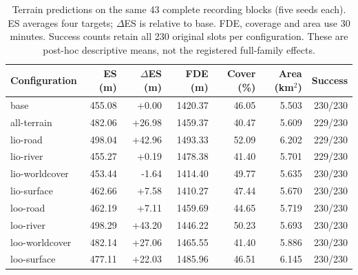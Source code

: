\begin{table}[!htbp]\centering
\caption{Terrain predictions on the same 43 complete recording blocks (five seeds each). ES averages four targets; $\Delta$ES is relative to base. FDE, coverage and area use 30 minutes. Success counts retain all 230 original slots per configuration. These are post-hoc descriptive means, not the registered full-family effects.}\label{tab:terrain-description}
\small\setlength{\tabcolsep}{3pt}
\begin{tabular}{lrrrrrr}\toprule
Configuration & ES (m) & $\Delta$ES (m) & FDE (m) & Cover (\%) & Area (km$^2$) & Success\\\midrule
base & 455.08 & +0.00 & 1420.37 & 46.05 & 5.503 & 230/230\\
all-terrain & 482.06 & +26.98 & 1459.37 & 40.47 & 5.609 & 229/230\\
lio-road & 498.04 & +42.96 & 1493.33 & 52.09 & 6.202 & 229/230\\
lio-river & 455.27 & +0.19 & 1478.38 & 41.40 & 5.701 & 229/230\\
lio-worldcover & 453.44 & -1.64 & 1414.40 & 49.77 & 5.635 & 230/230\\
lio-surface & 462.66 & +7.58 & 1410.27 & 47.44 & 5.670 & 230/230\\
loo-road & 462.19 & +7.11 & 1459.69 & 44.65 & 5.719 & 230/230\\
loo-river & 498.29 & +43.20 & 1446.22 & 50.23 & 5.693 & 230/230\\
loo-worldcover & 482.14 & +27.06 & 1465.55 & 41.40 & 5.886 & 230/230\\
loo-surface & 477.11 & +22.03 & 1485.96 & 46.51 & 6.145 & 230/230\\
\bottomrule\end{tabular}
\end{table}
